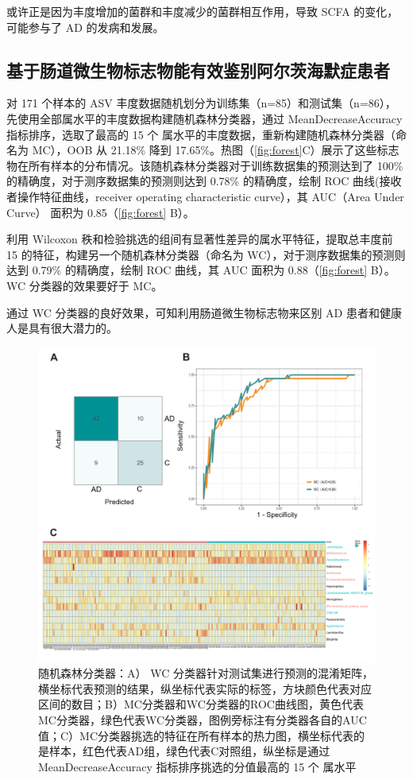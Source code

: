 \documentclass[supercite]{HustGraduPaper}
\begin{document}
或许正是因为丰度增加的菌群和丰度减少的菌群相互作用，导致 SCFA 的变化，可能参与了 AD 的发病和发展。



\subsection{基于肠道微生物标志物能有效鉴别阿尔茨海默症患者}
对 171 个样本的 ASV 丰度数据随机划分为训练集（n=85）和测试集（n=86），先使用全部属水平的丰度数据构建随机森林分类器，通过 MeanDecreaseAccuracy 指标排序，选取了最高的 15 个 属水平的丰度数据，重新构建随机森林分类器（命名为 MC），OOB 从 21.18\% 降到 17.65\%。热图（\autoref{fig:forest}C）展示了这些标志物在所有样本的分布情况。该随机森林分类器对于训练数据集的预测达到了 100\% 的精确度，对于测序数据集的预测则达到 0.78\% 的精确度，绘制 ROC 曲线(接收者操作特征曲线，receiver operating characteristic curve），其 AUC（Area Under Curve） 面积为 0.85（\autoref{fig:forest} B）。

利用 Wilcoxon 秩和检验挑选的组间有显著性差异的属水平特征，提取总丰度前 15 的特征，构建另一个随机森林分类器（命名为 WC），对于测序数据集的预测则达到 0.79\% 的精确度，绘制 ROC 曲线，其 AUC 面积为 0.88（\autoref{fig:forest} B）。WC 分类器的效果要好于 MC。

通过 WC 分类器的良好效果，可知利用肠道微生物标志物来区别 AD 患者和健康人是具有很大潜力的。
\begin{figure}[htb]
	\includegraphics[width=\textwidth]{plot/RandomForest.pdf}
	\caption{随机森林分类器：A） WC 分类器针对测试集进行预测的混淆矩阵，横坐标代表预测的结果，纵坐标代表实际的标签，方块颜色代表对应区间的数目；B）MC分类器和WC分类器的ROC曲线图，黄色代表MC分类器，绿色代表WC分类器，图例旁标注有分类器各自的AUC值；C）MC分类器挑选的特征在所有样本的热力图，横坐标代表的是样本，红色代表AD组，绿色代表C对照组，纵坐标是通过 MeanDecreaseAccuracy 指标排序挑选的分值最高的 15 个 属水平}
	\label{fig:forest}
\end{figure}
\end{document}
